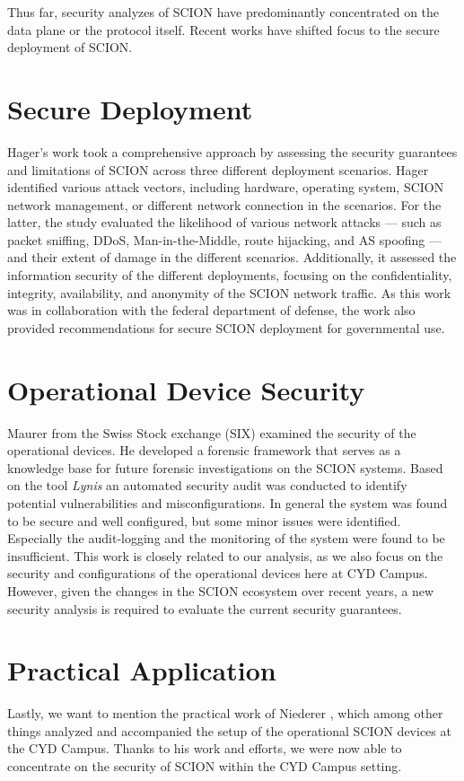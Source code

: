 Thus far, security analyzes of SCION have predominantly concentrated on the data plane or the protocol itself.
Recent works have shifted focus to the secure deployment of SCION.

\section{Secure Deployment}
Hager's work \cite{Hager2024} took a comprehensive approach by assessing the security guarantees and limitations of SCION across three different deployment scenarios.
Hager identified various attack vectors, including hardware, operating system, SCION network management, or different network connection in the scenarios.
For the latter, the study evaluated the likelihood of various network attacks --- such as packet sniffing, DDoS, Man-in-the-Middle, route hijacking, and AS spoofing --- and their extent of damage in the different scenarios.
Additionally, it assessed the information security of the different deployments, focusing on the confidentiality, integrity, availability, and anonymity of the SCION network traffic.
As this work was in collaboration with the federal department of defense, the work also provided recommendations for secure SCION deployment for governmental use.

\section{Operational Device Security}
Maurer \cite{Maurer2021} from the Swiss Stock exchange (SIX) examined the security of the operational devices.
He developed a forensic framework that serves as a knowledge base for future forensic investigations on the SCION systems.
Based on the tool \textit{Lynis} an automated security audit was conducted to identify potential vulnerabilities and misconfigurations.
In general the system was found to be secure and well configured, but some minor issues were identified.
Especially the audit-logging and the monitoring of the system were found to be insufficient.
This work is closely related to our analysis, as we also focus on the security and configurations of the operational devices here at CYD Campus.
However, given the changes in the SCION ecosystem over recent years, a new security analysis is required to evaluate the current security guarantees.

\section{Practical Application}
Lastly, we want to mention the practical work of Niederer \cite{Niederer2022}, which among other things analyzed and accompanied the setup of the operational SCION devices at the CYD Campus.
Thanks to his work and efforts, we were now able to concentrate on the security of SCION within the CYD Campus setting.

